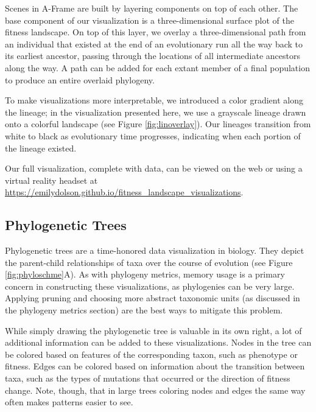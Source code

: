 \documentclass[letterpaper]{article}
\begin{document}
Scenes in A-Frame are built by layering components on top of each other. The base component of our visualization is a three-dimensional surface plot of the fitness landscape. On top of this layer, we overlay a three-dimensional path from an individual that existed at the end of an evolutionary run all the way back to its earliest ancestor, passing through the locations of all intermediate ancestors along the way. A path can be added for each extant member of a final population to produce an entire overlaid phylogeny.

To make visualizations more interpretable, we introduced a color gradient along the lineage; in the visualization presented here, we use a grayscale lineage drawn onto a colorful landscape (see Figure \ref{fig:linoverlay}).  Our lineages transition from white to black as evolutionary time progresses, indicating when each portion of the lineage existed.

Our full visualization, complete with data, can be viewed on the web or using a virtual reality headset at \url{https://emilydolson.github.io/fitness_landscape_visualizations}.

\subsection{Phylogenetic Trees}

Phylogenetic trees are a time-honored data visualization in biology. They depict the parent-child relationships of taxa over the course of evolution (see Figure \ref{fig:phyloschme}A). As with phylogeny metrics, memory usage is a primary concern in constructing these visualizations, as phylogenies can be very large. Applying pruning and choosing more abstract taxonomic units (as discussed in the phylogeny metrics section) are the best ways to mitigate this problem.

While simply drawing the phylogenetic tree is valuable in its own right, a lot of additional information can be added to these visualizations. Nodes in the tree can be colored based on features of the corresponding taxon, such as phenotype or fitness. Edges can be colored based on information about the transition between taxa, such as the types of mutations that occurred or the direction of fitness change. Note, though, that in large trees coloring nodes and edges the same way often makes patterns easier to see.
\end{document}
